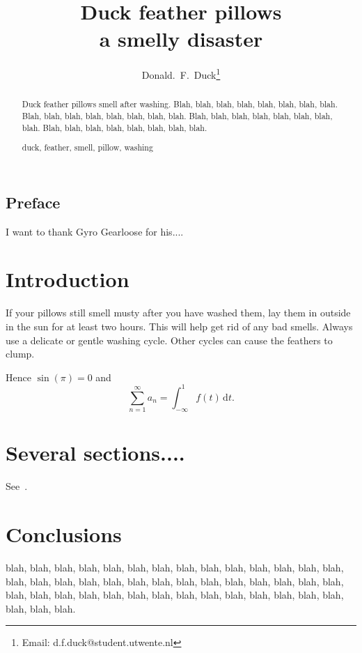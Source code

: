 \documentclass[11pt,fleqn]{article}
\author{Donald.~F.~Duck\thanks{Email:  
             d.f.duck@student.utwente.nl}}
\title{Duck feather pillows\\             
             a smelly disaster}
\begin{document}
 
\makecoverpage   
\subsection*{Preface}
I want to thank Gyro Gearloose for his....
\thispagestyle{empty} 
~\vfill               




\maketitle            
\setcounter{page}{1}  
\begin{abstract}      
  Duck feather pillows smell after washing. 
  Blah, blah, blah, blah, blah, blah, blah, blah. 
  Blah, blah, blah, blah, blah, blah, blah, blah. 
  Blah, blah, blah, blah, blah, blah, blah, blah. 
  Blah, blah, blah, blah, blah, blah, blah, blah. 

  \begin{keywords}    
   duck, feather, smell, pillow, washing
  \end{keywords}
\end{abstract}


\section{Introduction} 
If your pillows still smell musty after you have washed them, lay them
in outside in the sun for at least two hours. This will help get rid
of any bad smells. Always use a delicate or gentle washing
cycle. Other cycles can cause the feathers to clump.  

Hence $\sin(\pi)=0$ and
\[
   \sum_{n=1}^\infty a_n = \int_{-\infty}^1 f(t)\,\mathrm{d}t.
\]

\section{Several sections....}
See~\cite{1915Natur..96..396B,Ben1938}. 

\section{Conclusions}
blah, blah, blah, blah, blah, blah, blah, blah, blah, blah, 
blah, blah, blah, blah, blah, blah, blah, blah, blah, blah, 
blah, blah, blah, blah, blah, blah, blah, blah, blah, blah, 
blah, blah, blah, blah, blah, blah, blah, blah, blah, blah, 
blah, blah, blah, blah, blah.


\end{document}
